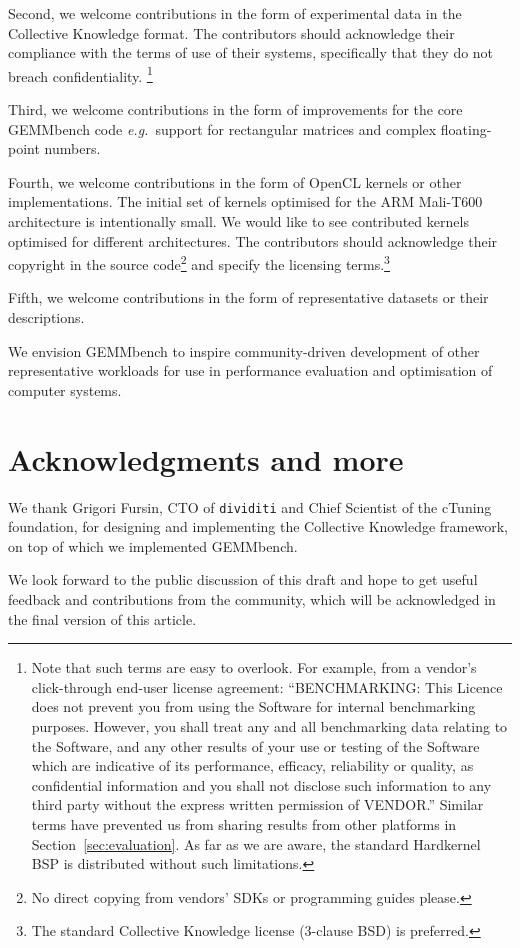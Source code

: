 \documentclass{acm_proc_article-sp} %
\begin{document}
Second, we welcome contributions in the form of experimental data in the
Collective Knowledge format.
%
The contributors should acknowledge their compliance with the terms of use of
their systems, specifically that they do not breach confidentiality.%
\footnote{Note that such terms are easy to overlook. For example, from a
vendor's click-through end-user license agreement: ``BENCHMARKING: This Licence
does not prevent you from using the Software for internal benchmarking
purposes. However, you shall treat any and all benchmarking data relating to
the Software, and any other results of your use or testing of the Software
which are indicative of its performance, efficacy, reliability or quality, as
confidential information and you shall not disclose such information to any
third party without the express written permission of VENDOR.'' Similar terms
have prevented us from sharing results from other platforms in
Section~\ref{sec:evaluation}. As far as we are aware, the standard Hardkernel
BSP is distributed without such limitations.}
%

Third, we welcome contributions in the form of improvements for the core
GEMMbench code {\em e.g.}\ support for rectangular matrices and complex
floating-point numbers.

Fourth, we welcome contributions in the form of OpenCL kernels or other
implementations.
%
The initial set of kernels optimised for the ARM Mali-T600 architecture is
intentionally small.
%
We would like to see contributed kernels optimised for different architectures.
%
The contributors should acknowledge their copyright in the source
code\footnote{No direct copying from vendors' SDKs or programming guides
please.} and specify the licensing terms.\footnote{The standard Collective
Knowledge license (3-clause BSD) is preferred.}
%

Fifth, we welcome contributions in the form of representative datasets or
their descriptions.

We envision GEMMbench to inspire community-driven development of other
representative workloads for use in performance evaluation and optimisation of
computer systems.

\section{Acknowledgments and more}

We thank Grigori Fursin, CTO of {\tt dividiti} and Chief Scientist of the
cTuning foundation, for designing and implementing the Collective
Knowledge framework, on top of which we implemented GEMMbench.

We look forward to the public discussion of this draft and hope to get useful
feedback and contributions from the community, which will be acknowledged in
the final version of this article.





\balancecolumns
\end{document}
